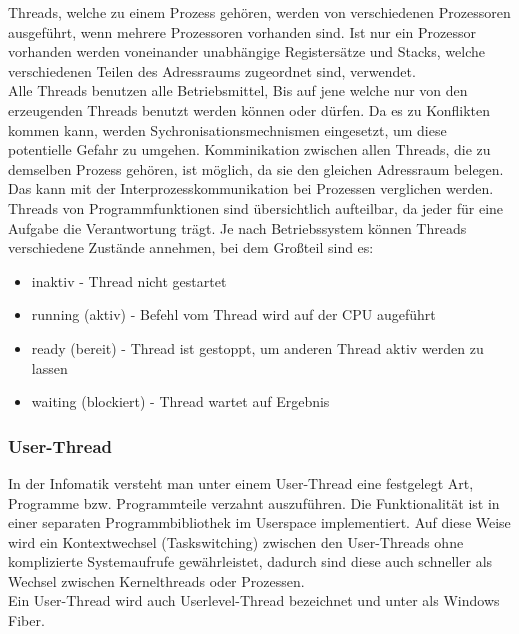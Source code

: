 \documentclass[12pt,a4paper]{report}
\begin{document}
\begin{onehalfspace}
Threads, welche zu einem Prozess gehören, werden von verschiedenen Prozessoren ausgeführt, wenn mehrere Prozessoren vorhanden sind. Ist nur ein Prozessor vorhanden werden voneinander unabhängige Registersätze und Stacks, welche verschiedenen Teilen des Adressraums zugeordnet sind, verwendet.\\

Alle Threads benutzen alle Betriebsmittel, Bis auf jene welche nur von den erzeugenden Threads benutzt werden können oder dürfen. Da es zu Konflikten kommen kann, werden Sychronisationsmechnismen eingesetzt, um diese potentielle Gefahr zu umgehen.
Komminikation zwischen allen Threads, die zu demselben Prozess gehören, ist möglich, da sie den gleichen Adressraum belegen. Das kann mit der Interprozesskommunikation bei Prozessen verglichen werden.\\

Threads von Programmfunktionen sind übersichtlich aufteilbar, da jeder für eine Aufgabe die Verantwortung trägt.  Je nach Betriebssystem können Threads verschiedene Zustände annehmen, bei dem Großteil sind es: 
\begin{itemize}
\item inaktiv -  Thread nicht gestartet
\item running (aktiv) - Befehl vom Thread wird auf der CPU augeführt
\item ready (bereit) - Thread ist gestoppt, um anderen Thread aktiv werden zu lassen
\item waiting (blockiert) - Thread wartet auf Ergebnis
\end{itemize}

\subsubsection{User-Thread}
In der Infomatik versteht man unter einem User-Thread eine festgelegt Art, Programme bzw. Programmteile verzahnt auszuführen. Die Funktionalität ist in einer separaten Programmbibliothek im Userspace implementiert. Auf diese Weise wird ein Kontextwechsel (Taskswitching) zwischen den User-Threads ohne komplizierte Systemaufrufe gewährleistet, dadurch sind diese auch schneller als Wechsel zwischen Kernelthreads oder Prozessen.\\
Ein User-Thread wird auch Userlevel-Thread bezeichnet und unter als Windows Fiber.



\end{onehalfspace}
\end{document}
